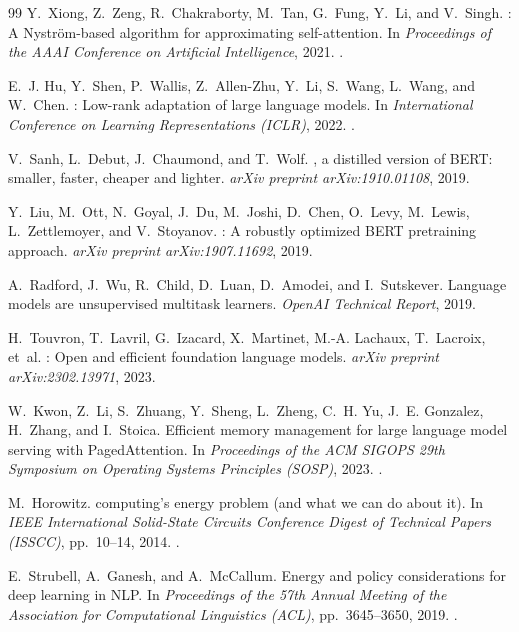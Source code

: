 \begin{thebibliography}{99}
Y.~Xiong, Z.~Zeng, R.~Chakraborty, M.~Tan, G.~Fung, Y.~Li, and V.~Singh.
: A {Nystr{\"o}m}-based algorithm for approximating self-attention.
\newblock In \emph{Proceedings of the AAAI Conference on Artificial Intelligence}, 2021.
\newblock {}.

E.~J. Hu, Y.~Shen, P.~Wallis, Z.~Allen-Zhu, Y.~Li, S.~Wang, L.~Wang, and W.~Chen.
: Low-rank adaptation of large language models.
\newblock In \emph{International Conference on Learning Representations (ICLR)}, 2022.
\newblock {}.

V.~Sanh, L.~Debut, J.~Chaumond, and T.~Wolf.
, a distilled version of {BERT}: smaller, faster, cheaper and lighter.
\newblock \emph{arXiv preprint arXiv:1910.01108}, 2019.

Y.~Liu, M.~Ott, N.~Goyal, J.~Du, M.~Joshi, D.~Chen, O.~Levy, M.~Lewis, L.~Zettlemoyer, and V.~Stoyanov.
: A robustly optimized {BERT} pretraining approach.
\newblock \emph{arXiv preprint arXiv:1907.11692}, 2019.

A.~Radford, J.~Wu, R.~Child, D.~Luan, D.~Amodei, and I.~Sutskever.
\newblock Language models are unsupervised multitask learners.
\newblock \emph{OpenAI Technical Report}, 2019.

H.~Touvron, T.~Lavril, G.~Izacard, X.~Martinet, M.-A. Lachaux, T.~Lacroix, et~al.
: Open and efficient foundation language models.
\newblock \emph{arXiv preprint arXiv:2302.13971}, 2023.

W.~Kwon, Z.~Li, S.~Zhuang, Y.~Sheng, L.~Zheng, C.~H. Yu, J.~E. Gonzalez, H.~Zhang, and I.~Stoica.
\newblock Efficient memory management for large language model serving with {PagedAttention}.
\newblock In \emph{Proceedings of the ACM SIGOPS 29th Symposium on Operating Systems Principles (SOSP)}, 2023.
\newblock {}.

M.~Horowitz.
 computing's energy problem (and what we can do about it).
\newblock In \emph{IEEE International Solid-State Circuits Conference Digest of Technical Papers (ISSCC)}, pp.~10--14, 2014.
\newblock {}.

E.~Strubell, A.~Ganesh, and A.~McCallum.
\newblock Energy and policy considerations for deep learning in {NLP}.
\newblock In \emph{Proceedings of the 57th Annual Meeting of the Association for Computational Linguistics (ACL)}, pp.~3645--3650, 2019.
\newblock {}.

\end{thebibliography}
